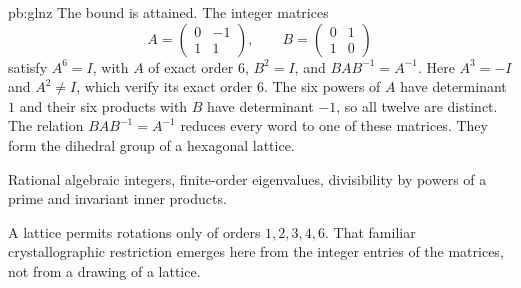 \begin{solution}{pb:glnz}
The bound is attained. The integer matrices
\[
A=\begin{pmatrix}0&-1\\1&1\end{pmatrix},
\qquad
B=\begin{pmatrix}0&1\\1&0\end{pmatrix}
\]
satisfy $A^6=I$, with $A$ of exact order $6$, $B^2=I$, and $BAB^{-1}=A^{-1}$. Here $A^3=-I$ and $A^2\ne I$, which verify its exact order $6$. The six powers of $A$ have determinant $1$ and their six products with $B$ have determinant $-1$, so all twelve are distinct. The relation $BAB^{-1}=A^{-1}$ reduces every word to one of these matrices. They form the dihedral group of a hexagonal lattice.

\tools Rational algebraic integers, finite-order eigenvalues, divisibility by powers of a prime and invariant inner products.

\leads A lattice permits rotations only of orders $1,2,3,4,6$. That familiar crystallographic restriction emerges here from the integer entries of the matrices, not from a drawing of a lattice.
\end{solution}

